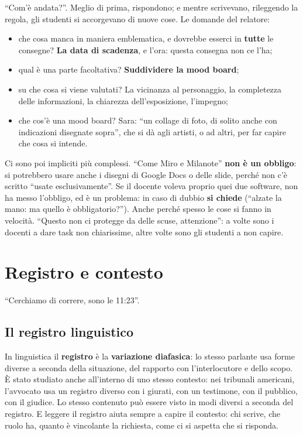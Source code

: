 ``Com'è andata?''. Meglio di prima, rispondono; e mentre scrivevano, rileggendo
la regola, gli studenti si accorgevano di nuove cose. Le domande del relatore:
\begin{itemize}
  \item che cosa manca in maniera emblematica, e dovrebbe esserci in
        \textbf{tutte} le consegne? \textbf{La data di scadenza}, e l'ora:
        questa consegna non ce l'ha;
  \item qual è una parte facoltativa? \textbf{Suddividere la mood board};
  \item su che cosa si viene valutati? La vicinanza al personaggio,
        la completezza delle informazioni, la chiarezza dell'esposizione,
        l'impegno;
  \item che cos'è una mood board? Sara: ``un collage di foto, di solito anche
        con indicazioni disegnate sopra'', che si dà agli artisti, o ad altri,
        per far capire che cosa si intende.
\end{itemize}
Ci sono poi impliciti più complessi. ``Come Miro e Milanote'' \textbf{non è un
obbligo}: si potrebbero usare anche i disegni di Google Docs o delle slide,
perché non c'è scritto ``usate esclusivamente''. Se il docente voleva proprio
quei due software, non ha messo l'obbligo, ed è un problema: in caso di dubbio
\textbf{si chiede} (``alzate la mano: ma quello è obbligatorio?''). Anche perché
spesso le cose si fanno in velocità. ``Questo non ci protegge da delle scuse,
attenzione'': a volte sono i docenti a dare task non chiarissime, altre volte
sono gli studenti a non capire.

\section{Registro e contesto}
\label{pt:sec:registro}

``Cerchiamo di correre, sono le 11:23''.

\subsection{Il registro linguistico}

In linguistica il \textbf{registro} è la \textbf{variazione diafasica}: lo
stesso parlante usa forme diverse a seconda della situazione, del rapporto con
l'interlocutore e dello scopo. È stato studiato anche all'interno di uno stesso
contesto: nei tribunali americani, l'avvocato usa un registro diverso con i
giurati, con un testimone, con il pubblico, con il giudice. Lo stesso contenuto
può essere visto in modi diversi a seconda del registro. E leggere il registro
aiuta sempre a capire il contesto: chi scrive, che ruolo ha, quanto è
vincolante la richiesta, come ci si aspetta che si risponda.

